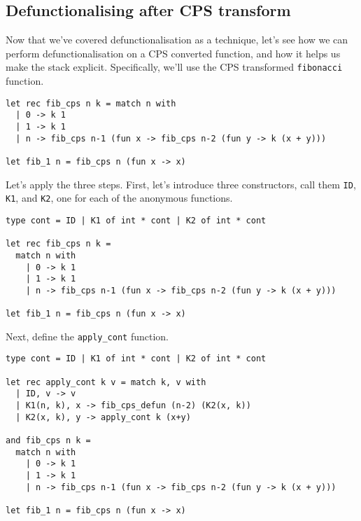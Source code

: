 \subsection{Defunctionalising after CPS transform}\label{subsection:defun-with-cps}
Now that we've covered defunctionalisation as a technique, let's see how we can perform defunctionalisation on a CPS converted function, and how it helps us make the stack explicit. Specifically, we'll use the CPS transformed \texttt{fibonacci} function.

\begin{code}
\label{code:defun-fib-0}
\begin{verbatim}
let rec fib_cps n k = match n with
  | 0 -> k 1
  | 1 -> k 1
  | n -> fib_cps n-1 (fun x -> fib_cps n-2 (fun y -> k (x + y)))

let fib_1 n = fib_cps n (fun x -> x)
\end{verbatim}
\end{code}

Let's apply the three steps. First, let's introduce three constructors, call them \texttt{ID}, \texttt{K1}, and \texttt{K2}, one for each of the anonymous functions. 

\begin{code}
\label{code:defun-fib-1}
\begin{verbatim}
type cont = ID | K1 of int * cont | K2 of int * cont

let rec fib_cps n k = 
  match n with
    | 0 -> k 1
    | 1 -> k 1
    | n -> fib_cps n-1 (fun x -> fib_cps n-2 (fun y -> k (x + y)))

let fib_1 n = fib_cps n (fun x -> x)
\end{verbatim}
\end{code}

Next, define the \texttt{apply\_cont} function. 

\begin{code}
\label{code:defun-fib-2}
\begin{verbatim}
type cont = ID | K1 of int * cont | K2 of int * cont

let rec apply_cont k v = match k, v with
  | ID, v -> v
  | K1(n, k), x -> fib_cps_defun (n-2) (K2(x, k))
  | K2(x, k), y -> apply_cont k (x+y)

and fib_cps n k = 
  match n with
    | 0 -> k 1
    | 1 -> k 1
    | n -> fib_cps n-1 (fun x -> fib_cps n-2 (fun y -> k (x + y)))

let fib_1 n = fib_cps n (fun x -> x)
\end{verbatim}
\end{code}

